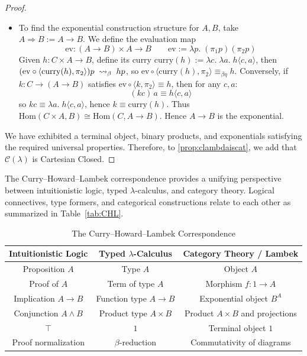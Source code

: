\begin{proof}
\begin{itemize}
    satisfies the universal property of a product and that the diagram \ref{def:categoricalproduct} commutes in this instance.
  \item To find the exponential construction structure for $A,B$, take $A\Rightarrow B := A\to B$. We define the evaluation map
\[
\mathrm{ev} : (A\to B)\times A \to B \qquad
\mathrm{ev} := \lambda p.\; (\pi_1 p)(\pi_2 p)
\]
Given $h:C\times A\to B$, define its curry
\(
\mathrm{curry}(h) := \lambda c.\; \lambda a.\; h\langle c,a\rangle
\), 
then
\(
(\mathrm{ev}\circ \langle \mathrm{curry}(h),\pi_2\rangle)p
\;\mathrel{\leadsto}_\beta\; h p
\),
so $\mathrm{ev}\circ \langle \mathrm{curry}(h),\pi_2\rangle \equiv_{\beta\eta} h$.
Conversely, if $k:C\to (A\to B)$ satisfies $\mathrm{ev}\circ \langle k,\pi_2\rangle \equiv h$, then for any $c,a$:
\[
(k c)\,a \equiv h\langle c,a\rangle
\]
so $k c \equiv \lambda a.\; h\langle c,a\rangle$, hence $k \equiv \mathrm{curry}(h)$.
Thus
\(
\mathrm{Hom}(C\times A,B) \cong \mathrm{Hom}(C,A\to B)
\). Hence $A\to B$ is the exponential.
    
\end{itemize}

We have exhibited a terminal object, binary products, and exponentials satisfying the required universal properties. Therefore, to \ref{prop:clambdaiscat}, we add that $\mathcal{C}(\lambda)$ is Cartesian Closed.
\end{proof}

The Curry--Howard--Lambek correspondence provides a unifying perspective between intuitionistic logic, typed $\lambda$-calculus, and category theory. Logical connectives, type formers, and categorical constructions relate to each other as summarized in Table~\ref{tab:CHL}.

\begin{table}[h!]
  \centering
  \caption{The Curry--Howard--Lambek Correspondence}
  \label{tab:CHL}
  \begin{tabular}{|c|c|c|}
    \hline
    \textbf{Intuitionistic Logic} & \textbf{Typed $\lambda$-Calculus} & \textbf{Category Theory / Lambek} \\
    \hline
    Proposition $A$ & Type $A$ & Object $A$ \\
    Proof of $A$ & Term of type $A$ & Morphism $f: 1 \to A$ \\
    Implication $A \rightarrow B$ & Function type $A \to B$ & Exponential object $B^A$ \\
    Conjunction $A \land B$ & Product type $A \times B$ & Product $A \times B$ and projections \\
    $\top$ & $1$ & Terminal object $1$ \\
    Proof normalization & $\beta$-reduction & { Commutativity of diagrams } \\
    \hline
  \end{tabular}
  \label{tab:curry-howard-lambek}
\end{table}

